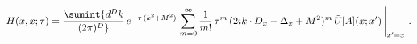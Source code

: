 \begin{equation}
  \label{eq:diagheatgaugecov}
H(x,x;\tau) = \sumint {d^{D}k \over (2 \pi)^{D}} \, e^{-\tau \, (k^2+M^2)}
\left. 
\sum\limits_{m=0}^\infty {1 \over m!} \, \tau^m \, (2 i k \cdot D_x - \Delta_x + M^2)^m
\, \tilde U[A](x;x') \, \right\vert_{x' = x}  \,.
\end{equation}

